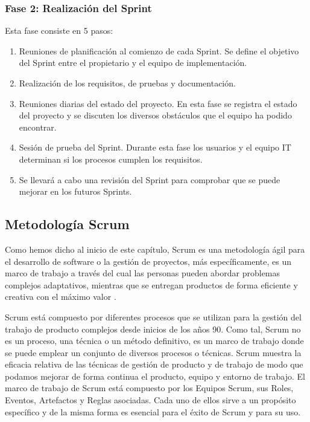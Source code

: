 \subsubsection{Fase 2: Realización del Sprint}

Esta fase consiste en 5 pasos:

\begin{enumerate}
	\item Reuniones de planificación al comienzo de cada Sprint. Se define el objetivo del Sprint entre el propietario y el equipo de implementación.
	\item Realización de los requisitos, de pruebas y documentación.
	\item Reuniones diarias del estado del proyecto. En esta fase se registra el estado del proyecto y se discuten los diversos obstáculos que el equipo ha podido encontrar.
	\item Sesión de prueba del Sprint. Durante esta fase los usuarios y el equipo IT determinan si los procesos cumplen los requisitos.
	\item Se llevará a cabo una revisión del Sprint para comprobar que se puede mejorar en los futuros Sprints.
\end{enumerate}

\subsection{Metodología Scrum}

Como hemos dicho al inicio de este capítulo, Scrum es una metodología ágil para el desarrollo de software o la gestión de proyectos, más específicamente, es un marco de trabajo a través del cual las personas pueden abordar problemas complejos adaptativos, mientras que se entregan productos de forma eficiente y creativa con el máximo valor \cite{scrum-guia}.

Scrum está compuesto por diferentes procesos que se utilizan para la gestión del trabajo de producto complejos desde inicios de los años 90. Como tal, Scrum no es un proceso, una técnica o un método definitivo, es un marco de trabajo donde se puede emplear un conjunto de diversos procesos o técnicas. Scrum muestra la eficacia relativa de las técnicas de gestión de producto y de trabajo de modo que podamos mejorar de forma continua el producto, equipo y entorno de trabajo. El marco de trabajo de Scrum está compuesto por los Equipos Scrum, sus Roles, Eventos, Artefactos y Reglas asociadas. Cada uno de ellos sirve a un propósito específico y de la misma forma es esencial para el éxito de Scrum y para su uso.

